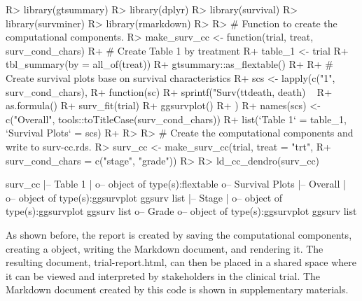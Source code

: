 \documentclass[
]{jss}
\begin{document}
\begin{CodeChunk}

\begin{CodeInput}
R> library(gtsummary)
R> library(dplyr)
R> library(survival)
R> library(survminer)
R> library(rmarkdown)
R> 
R> # Function to create the computational components.
R> make_surv_cc <- function(trial, treat, surv_cond_chars) {
R+   # Create Table 1 by treatment
R+   table_1 <- trial %
R+     tbl_summary(by = all_of(treat)) %
R+     gtsummary::as_flextable()
R+ 
R+   # Create survival plots base on survival characteristics
R+   scs <- lapply(c("1", surv_cond_chars),
R+                 function(sc) {
R+                   sprintf("Surv(ttdeath, death) ~ %
R+                     as.formula() %
R+                     surv_fit(trial) %
R+                     ggsurvplot()
R+                 })
R+   names(scs) <- c("Overall", tools::toTitleCase(surv_cond_chars))
R+   list(`Table 1` = table_1, `Survival Plots` = scs)
R+ }
R> 
R> # Create the computational components and write to surv-cc.rds.
R> surv_cc <- make_surv_cc(trial, treat = "trt",
R+                         surv_cond_chars = c("stage", "grade"))
R> 
R> ld_cc_dendro(surv_cc)
\end{CodeInput}

\begin{CodeOutput}

surv_cc
  |-- Table 1
  |  o-- object of type(s):flextable
  o-- Survival Plots
   |-- Overall
   |  o-- object of type(s):ggsurvplot ggsurv list
   |-- Stage
   |  o-- object of type(s):ggsurvplot ggsurv list
   o-- Grade
      o-- object of type(s):ggsurvplot ggsurv list
\end{CodeOutput}
\end{CodeChunk}

As shown before, the report is created by saving the computational
components, creating a  object, writing the 
Markdown document, and rendering it. The resulting document,
trial-report.html, can then be placed in a shared space where it can be
viewed and interpreted by stakeholders in the clinical trial. The
 Markdown document created by this code is shown in
supplementary materials.
\end{document}
